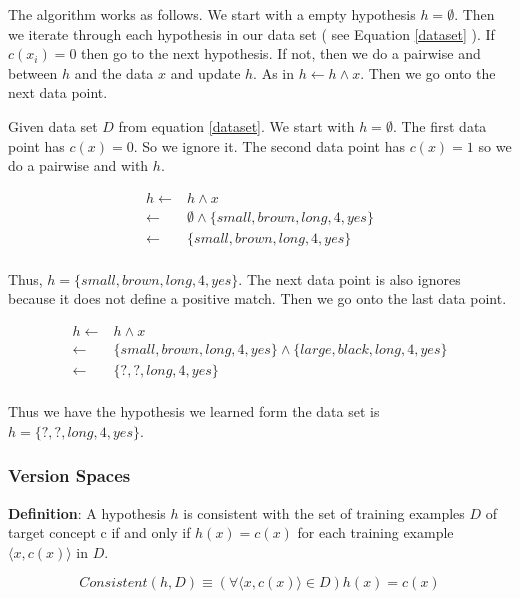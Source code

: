 \documentclass[10pt,a4paper]{article}
\begin{document}
The algorithm works as follows. We start with a empty hypothesis $h = \emptyset$. Then we iterate through each hypothesis in our data set ( see Equation \ref{dataset} ). If $c(x_i) = 0 $ then go to the next hypothesis. If not, then we do a pairwise and between $h$ and the data $x$ and update $h$. As in $h \leftarrow h \wedge x$. Then we go onto the next data point.

Given data set $D$ from equation \ref{dataset}. We start with $h = \emptyset$. The first data point has $c(x) = 0$. So we ignore it. The second data point has $c(x) = 1$ so we do a pairwise and with $h$.

\begin{equation}
\begin{split}
h \leftarrow & h \wedge x \\
  \leftarrow & \emptyset \wedge \{small,brown,long,4,yes\} \\
  \leftarrow & \{small,brown,long,4,yes\} \\
\end{split}
\end{equation}

Thus, $h =  \{small,brown,long,4,yes\}$.
The next data point is also ignores because it does not define a positive match. Then we go onto the last data point.

\begin{equation}
\begin{split}
h \leftarrow & h \wedge x \\
  \leftarrow & \{small,brown,long,4,yes\} \wedge \{large,black,long,4,yes\} \\
  \leftarrow & \{?,?,long,4,yes\} \\
\end{split}
\end{equation}

Thus we have the hypothesis we learned form the data set is $h =\{?,?,long,4,yes\}$. 

\citep{stan}

\subsubsection{Version Spaces}
\textbf{Definition}: A hypothesis $h$ is consistent with the set of training examples $D$ of target concept c if and only if $h(x) = c(x)$ for each training example $\langle x,c(x) \rangle$ in $D$.

\begin{equation}
Consistent(h,D)\equiv ( \forall \langle x,c(x) \rangle \in D) h(x) = c(x)
\end{equation}
\end{document}
